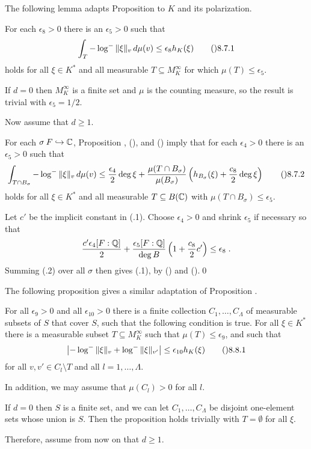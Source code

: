 The following lemma adapts Proposition  to $K$ and its polarization.

  For each $\epsilon_8>0$ there is an $\epsilon_5>0$ such that
$$\int_T {-\log^{-}\|\xi\|_v}\,d\mu(v) \le \epsilon_8 h_K(\xi)\tag\08.7.1$$
holds for all $\xi\in K^{*}$ and all measurable $T\subseteq M_K^\infty$
for which $\mu(T)\le\epsilon_5$.
\endit

  If $d=0$ then $M_K^\infty$ is a finite set and $\mu$ is
the counting measure, so the result is trivial with $\epsilon_5=1/2$.

Now assume that $d\ge1$.

For each
$\sigma\:F\hookrightarrow\Bbb C$, Proposition , (), and ()
imply that for each $\epsilon_4>0$ there is an $\epsilon_5>0$ such that
$$\int_{T\cap B_\sigma} {-\log^{-}\|\xi\|_v}\,d\mu(v)
  \le \frac{\epsilon_4}{2}\deg\xi
    + \frac{\mu(T\cap B_\sigma)}{\mu(B_\sigma)}
      \left(h_{B_\sigma}(\xi) + \frac{c_8}{2}\deg\xi\right)\tag\08.7.2$$
holds for all $\xi\in K^{*}$ and all measurable $T\subseteq B(\Bbb C)$
with $\mu(T\cap B_\sigma)\le\epsilon_5$.

Let $c'$ be the implicit constant in (.1).  Choose $\epsilon_4>0$
and shrink $\epsilon_5$ if necessary so that
$$\frac{c'\epsilon_4[F:\Bbb Q]}{2}
    + \frac{\epsilon_5[F:\Bbb Q]}{\deg B} \left(1 + \frac{c_8}{2}c'\right)
  \le \epsilon_8\;.$$
Summing (.2) over all $\sigma$ then gives (.1), by ()
and ().\qed
\enddemo

The following proposition gives a similar adaptation of Proposition .

  For all $\epsilon_9>0$ and all $\epsilon_{10}>0$
there is a finite collection $C_1,\dots,C_\Lambda$ of measurable subsets
of $S$ that cover $S$, such that the following condition is true.
For all $\xi\in K^{*}$ there is a measurable subset
$T\subseteq M_K^\infty$ such that $\mu(T)\le\epsilon_9$, and such that
$$\bigl|-\log^{-}\|\xi\|_v+\log^{-}\|\xi\|_{v'}\bigr|
  \le \epsilon_{10} h_K(\xi)\tag\08.8.1$$
for all $v,v'\in C_l\setminus T$ and all $l=1,\dots,\Lambda$.

In addition, we may assume that $\mu(C_l)>0$ for all $l$.
\endit

  If $d=0$ then $S$ is a finite set, and we can let
$C_1,\dots,C_\Lambda$ be disjoint one-element sets whose union is $S$.
Then the proposition holds trivially with $T=\emptyset$ for all $\xi$.

Therefore, assume from now on that $d\ge1$.

